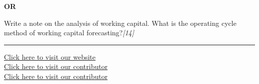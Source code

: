 \documentclass[11pt,a4paper]{article}
\newcommand{\pts}[1]{\hfill   \textit{[#1]}}
\begin{document}
\centerline{   \textbf{OR}}

Write a note on the analysis of working capital. What is the operating cycle method of working capital forecasting?\pts{14}

\vfill
\rule{\linewidth}{0.4pt}

\begin{center}\small
\href{https://bhu-exam.vercel.app/}{Click here to visit our website}\\[4pt]
\href{https://me-aryan.vercel.app/}{Click here to visit our contributor}\\[4pt]
\href{https://quashan-me.vercel.app/}{Click here to visit our contributor}
\end{center}
\end{document}
